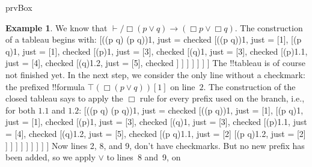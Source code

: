 \documentclass[10pt,a4paper]{article}
\theoremstyle{plain}
\theoremstyle{definition}
\newtheorem{ex}[thm]{Example}
\theoremstyle{remark}
\newenvironment{oltableau}{}{}
\providecommand{\lif}{\mathbin{\rightarrow}}
\providecommand{\Proves}{\mathrel{\vdash}}
\providecommand{\sFmla}[2]{#1(#2)}
\providecommand{\pFmla}[2]{#1(#2)}
\providecommand{\True}{\top}
\providecommand{\False}{\bot}
\providecommand{\iftag}[1]{#1}
\providecommand{\TAss}[1]{}
\providecommand{\TRule}[1]{}
\providecommand{\iftag}{}
\begin{document}
\iftag{prvBox}{
\begin{ex}
  We know that $\Proves/ \Box(p \lor q) \lif (\Box p \lor \Box
  q)$. The construction of a tableau begins with:
  \begin{oltableau}
    [\pFmla{\False}{\Box(p \lor q) \lif (\Box p \lor \Box q)}{1},
      just = \TAss, checked
      [\pFmla{\True}{\Box(p \lor q)}{1},
        just = {\TRule{\False}{\lif}[1]}, 
        [\pFmla{\False}{\Box p \lor \Box q}{1},
          just = {\TRule{\False}{\lif}[1]}, checked
          [\pFmla{\False}{\Box p}{1},
            just = {\TRule{\False}{\lor}[3]}, checked
            [\pFmla{\False}{\Box q}{1},
              just = {\TRule{\False}{\lor}[3]}, checked
              [\pFmla{\False}{p}{1.1}, 
                just = {\TRule{\False}{\Box}[4]}, checked
                [\pFmla{\False}{q}{1.2}, 
                  just = {\TRule{\False}{\Box}[5]}, checked
                ]
              ]
            ]
          ]
        ]
      ]
    ]
  \end{oltableau}
  The !!{tableau} is of course not finished yet. In the next step, we
  consider the only line without a checkmark: the prefixed !!{formula}
  $\sFmla{\True}{\Box(p \lor q)}[1]$ on line~$2$. The construction of
  the closed tableau says to apply the $\TRule{\True}{\Box}$ rule for
  every prefix used on the branch, i.e., for both $1.1$ and $1.2$:
  \begin{oltableau}
    [\pFmla{\False}{\Box(p \lor q) \lif (\Box p \lor \Box q)}{1},
      just = \TAss, checked
      [\pFmla{\True}{\Box(p \lor q)}{1},
        just = {\TRule{\False}{\lif}[1]}, 
        [\pFmla{\False}{\Box p \lor \Box q}{1},
          just = {\TRule{\False}{\lif}[1]}, checked
          [\pFmla{\False}{\Box p}{1},
            just = {\TRule{\False}{\lor}[3]}, checked
            [\pFmla{\False}{\Box q}{1},
              just = {\TRule{\False}{\lor}[3]}, checked
              [\pFmla{\False}{p}{1.1}, 
                just = {\TRule{\False}{\Box}[4]}, checked
                [\pFmla{\False}{q}{1.2}, 
                  just = {\TRule{\False}{\Box}[5]}, checked
                  [\pFmla{\True}{p \lor q}{1.1}, 
                    just = {\TRule{\True}{\Box}[2]}
                    [\pFmla{\True}{p \lor q}{1.2}, 
                      just = {\TRule{\True}{\Box}[2]}
                    ]
                  ]
                ]
              ]
            ]
          ]
        ]
      ]
    ]
  \end{oltableau}
  Now lines 2, 8, and 9, don't have checkmarks. But no new prefix has
  been added, so we apply $\TRule{\True}{\lor}$ to lines~8 and~9, on

\end{ex}}
\end{document}
